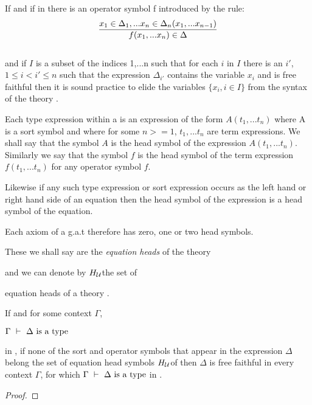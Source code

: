 \documentclass[10pt,a4paper,fleqn]{article}
\newcommand{\heads}[1][U]{\ensuremath{H_{\gat[#1]}}}
\begin{document}
\begin{lemma}
If \isagat and if in \gat there is an operator symbol f introduced by the rule:\\

$$\frac{x_1 \in \Delta_1,... x_{n} \in \Delta_{n}(x_1,...x_{n-1})}{f(x_1,...x_n) \in \Delta}$$ \\

\noindent
and if $I$ is a subset of the indices {1,...n} such that for each $i$ in $I$ there is an
$i'$, $1 \leq i < i'\leq n$ such that the expression $\Delta_{i'}$ contains the variable 
$x_i$ and  is free faithful then it is sound practice to elide the variables $\{x_i, i \in I \}$ from the
syntax of the theory \gat.
\end{lemma}



\begin{definition}
Each type expression within a \gat is an expression of the form $A(t_1,...t_n)$
where A is a sort symbol and where for some $n >= 1$, $t_1,...t_n$ are term expressions.
We shall say that the symbol $A$ is the head symbol of the expression $A(t_1,...t_n)$.
Similarly we say that the symbol $f$ is the head symbol of the term expression
$f(t_1,...t_n)$ for any operator symbol $f$. 

Likewise if any such type expression or sort expression occurs as the left hand or right hand side of an equation then the head symbol of the expression is a head symbol of the equation. 

Each axiom of a g.a.t therefore has zero, one or two head symbols. 

These we shall say are the \textit{equation heads} of the theory 

and we can denote by \heads the set of 

equation heads of a theory \gat.
\end{definition}

\begin{lemma}
If \isagat and for some context $\Gamma$, \\
\begin{center}
$\Gamma\  \tstyle\ \isT{\Delta}$ 
\end{center}
\noindent
in \gat, if none of the sort and operator symbols that appear in the expression $\Delta$ belong the set of equation head symbols \heads of \gat then $\Delta$ is 
free faithful in every context $\Gamma$, for which  $\Gamma\  \tstyle\ \isT{\Delta}$ in \gat.
\end{lemma}
 
\begin{proof}

\end{proof}
 



 
\end{document}
